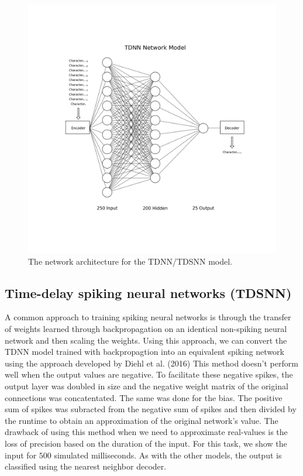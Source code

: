 \documentclass{article}
\begin{document}
\begin{figure}[!h]
    \centering
    \includegraphics[width=\linewidth]{../diagrams/tdnn.png}
    \caption{The network architecture for the TDNN/TDSNN model.}
    \label{fig:lstm-online-model}
\end{figure}

\subsection*{Time-delay spiking neural networks (TDSNN)}

A common approach to training spiking neural networks \cite{diehl2015fast} is through the transfer of weights learned through backpropagation on an identical non-spiking neural network and then scaling the weights. Using this approach, we can convert the TDNN model trained with backpropagtion into an equivalent spiking network using the approach developed by Diehl et al. (2016) This method doesn't perform well when the output values are negative. To facilitate these negative spikes, the output layer was doubled in size and the negative weight matrix of the original connections was concatentated. The same was done for the bias. The positive sum of spikes was subracted from the negative sum of spikes and then divided by the runtime to obtain an approximation of the original network's value.
The drawback of using this method when we need to approximate real-values is the loss of precision based on the duration of the input. For this task, we show the input for $500$ simulated milliseconds. As with the other models, the output is classified using the nearest neighbor decoder.
\end{document}

